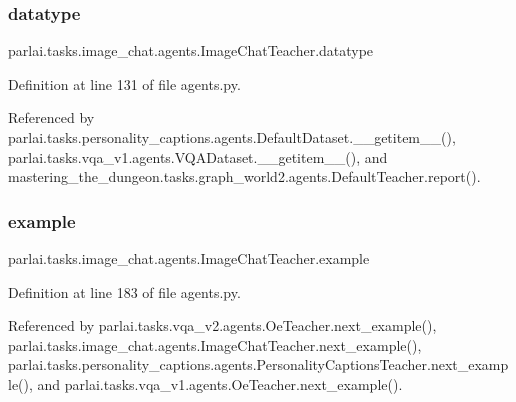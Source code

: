 \mbox{\label{classparlai_1_1tasks_1_1image__chat_1_1agents_1_1ImageChatTeacher_a3233a84a5603090a6c04cd5e7240c084}} 
\subsubsection{\texorpdfstring{datatype}{datatype}}
{\footnotesize\ttfamily parlai.\+tasks.\+image\+\_\+chat.\+agents.\+Image\+Chat\+Teacher.\+datatype}



Definition at line 131 of file agents.\+py.



Referenced by parlai.\+tasks.\+personality\+\_\+captions.\+agents.\+Default\+Dataset.\+\_\+\+\_\+getitem\+\_\+\+\_\+(), parlai.\+tasks.\+vqa\+\_\+v1.\+agents.\+V\+Q\+A\+Dataset.\+\_\+\+\_\+getitem\+\_\+\+\_\+(), and mastering\+\_\+the\+\_\+dungeon.\+tasks.\+graph\+\_\+world2.\+agents.\+Default\+Teacher.\+report().

\mbox{\label{classparlai_1_1tasks_1_1image__chat_1_1agents_1_1ImageChatTeacher_a14105336d54e1f2662fdee38f9e5037e}} 
\subsubsection{\texorpdfstring{example}{example}}
{\footnotesize\ttfamily parlai.\+tasks.\+image\+\_\+chat.\+agents.\+Image\+Chat\+Teacher.\+example}



Definition at line 183 of file agents.\+py.



Referenced by parlai.\+tasks.\+vqa\+\_\+v2.\+agents.\+Oe\+Teacher.\+next\+\_\+example(), parlai.\+tasks.\+image\+\_\+chat.\+agents.\+Image\+Chat\+Teacher.\+next\+\_\+example(), parlai.\+tasks.\+personality\+\_\+captions.\+agents.\+Personality\+Captions\+Teacher.\+next\+\_\+example(), and parlai.\+tasks.\+vqa\+\_\+v1.\+agents.\+Oe\+Teacher.\+next\+\_\+example().

